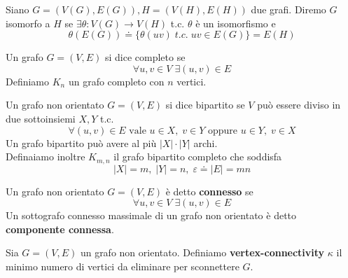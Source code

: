 \begin{definizione}
    Siano \(G=(V(G),E(G)), H=(V(H),E(H))\) due grafi. Diremo \(G\) isomorfo a \(H\) se \(\exists \theta : V(G) \to V(H)\) t.c. \(\theta\) è un isomorfismo e
    \begin{equation}
        \theta(E(G)) \doteq \{ \theta(uv) \; t.c.\; uv \in E(G)\} = E(H)
    \end{equation}
\end{definizione}

\begin{definizione}
    Un grafo \(G=(V,E)\) si dice completo se
    \begin{equation}
        \forall u,v \in V \; \exists (u,v) \in E
    \end{equation} 
    Definiamo \(K_n\) un grafo completo con \(n\) vertici.
\end{definizione}

\begin{definizione}
    Un grafo non orientato \(G=(V,E)\) si dice bipartito se \(V\) può essere diviso in due sottoinsiemi \(X,Y\) t.c.
    \begin{equation}
        \forall (u,v) \in E \text{ vale } u\in X,\; v\in Y \text{ oppure } u\in Y,\; v\in X  
    \end{equation}
    Un grafo bipartito può avere al più \(|X|\cdot |Y|\) archi. \\
    Definaiamo inoltre \(K_{m,n}\) il grafo bipartito completo che soddisfa
    \begin{equation}
        |X|=m,\; |Y|=n,\; \varepsilon \doteq |E| = mn
    \end{equation}
\end{definizione}


\begin{definizione}[Connessione]
    Un grafo non orientato \(G=(V,E)\) è detto \textbf{connesso} se
    \begin{equation}
        \forall u,v \in V \; \exists (u,v) \in E
    \end{equation}
    Un sottografo connesso massimale di un grafo non orientato è detto \textbf{componente connessa}.
\end{definizione}

\begin{definizione}
    Sia \(G=(V,E)\) un grafo non orientato. Definiamo \textbf{vertex-connectivity}  \(\kappa\) il minimo numero di vertici da eliminare per sconnettere \(G\).
\end{definizione}

